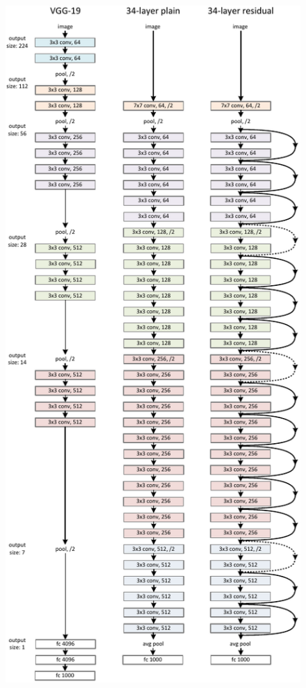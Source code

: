 \documentclass[10pt,twocolumn,letterpaper]{article}
\begin{document}
\begin{figure}[t]
  \begin{center}
    \vspace{.5em}
    \includegraphics[width=1.0\linewidth]{eps/arch}

\end{center}
\end{figure}
\end{document}
